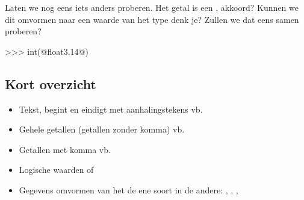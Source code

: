 \begin{letsTryOut}
	Laten we nog eens iets anders proberen.
	Het getal  is een , akkoord?
	Kunnen we dit omvormen naar een waarde van het type  denk je?
	\newline
	Zullen we dat eens samen proberen?
\begin{pyEnv}
>>> int(@float3.14@)
\end{pyEnv}
\end{letsTryOut}

\subsection{Kort overzicht}


\begin{itemize}
	\item
		\stringtype
		\newline
		Tekst, begint en eindigt met aanhalingstekens
		\newline
		vb. 
	\item
		\integertype
		\newline
		Gehele getallen (getallen zonder komma)
		\newline
		vb. 
	\item
		\floattype
		\newline
		Getallen met komma
		\newline
		vb. 
	\item
		\booleantype
		\newline
		Logische waarden
		\newline
		\true of \false
	\item
		Gegevens omvormen van het de ene soort in de andere:
		\newline
		, , , 
\end{itemize}